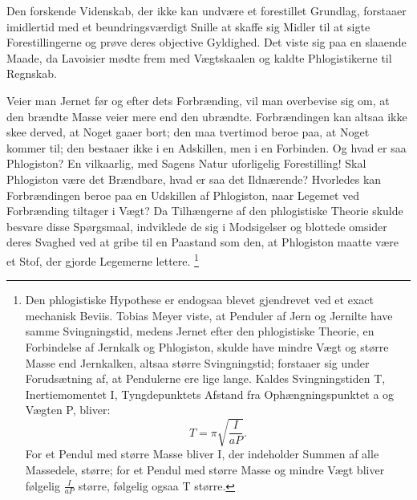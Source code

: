 \documentclass[12pt,a4paper]{book}
\begin{document}
Den forskende Videnskab, der ikke kan undvære et forestillet Grundlag,
forstaaer imidlertid med et beundringsværdigt Snille at skaffe sig Midler
til at sigte Forestillingerne og prøve deres objective Gyldighed. Det
viste sig paa en slaaende Maade, da Lavoisier mødte frem med Vægtskaalen
og kaldte Phlogistikerne til Regnskab.

Veier man Jernet før og efter dets Forbrænding, vil man overbevise sig om,
at den brændte Masse veier mere end den ubrændte. Forbrændingen kan altsaa
ikke skee derved, at Noget gaaer bort; den maa tvertimod beroe paa, at
Noget kommer til; den bestaaer ikke i en Adskillen, men i en Forbinden. Og
hvad er saa Phlogiston? En vilkaarlig, med Sagens Natur uforligelig
Forestilling! Skal Phlogiston være det Brændbare, hvad er saa det
Ildnærende? Hvorledes kan Forbrændingen beroe paa en Udskillen af
Phlogiston, naar Legemet ved Forbrænding tiltager i Vægt? Da Tilhængerne
af den phlogistiske Theorie skulde besvare disse Spørgsmaal, indviklede de
sig i Modsigelser og blottede omsider deres Svaghed ved at gribe til en
Paastand som
den, at Phlogiston maatte være et Stof, der gjorde Legemerne lettere.%
\footnote{%
Den phlogistiske Hypothese er endogsaa blevet gjendrevet ved et exact
mechanisk Beviis. Tobias Meyer viste, at Penduler af Jern og Jernilte have
samme Svingningstid, medens Jernet efter den phlogistiske Theorie, en
Forbindelse af Jernkalk og Phlogiston, skulde have mindre Vægt og større
Masse end Jernkalken, altsaa større Svingningstid; forstaaer sig under
Forudsætning af, at Pendulerne ere lige lange. Kaldes Svingningstiden T,
Inertiemomentet I, Tyngdepunktets Afstand fra Ophængningspunktet a og
Vægten P, bliver:
\[ T = \pi \sqrt{\frac{I}{aP}}. \]
For et Pendul med større Masse bliver I, der indeholder Summen af alle
Massedele, større; for et Pendul med større Masse og mindre Vægt bliver
følgelig $\frac{I}{aP}$ større, følgelig ogsaa T større.}
\end{document}
